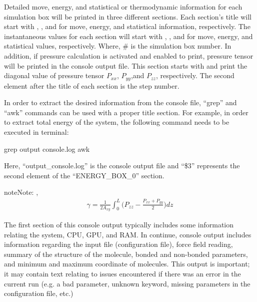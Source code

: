 \documentclass[letterpaper,10pt,english]{sphinxmanual}
\begin{document}
Detailed move, energy, and statistical or thermodynamic information for each simulation box will be printed in three different sections. Each section’s title will start with , , and  for move, energy, and statistical information, respectively. The instantaneous values for each section will start with , , and  for move, energy, and statistical values, respectively. Where, \# is the simulation box number. In addition, if pressure calculation is activated and enabled to print, pressure tensor will be printed in the console output file. This section starts with  and print the diagonal value of pressure tensor \(P_{xx}\), \(P_{yy}\),and \(P_{zz}\), respectively. The second element after the title of each section is the step number.

In order to extract the desired information from the console file, “grep” and “awk” commands can be used with a proper title section. For example, in order to extract total energy of the system, the following command needs to be executed in terminal:

%
\begin{sphinxVerbatim}[commandchars=\\\{\}]
\PYGZdl{} grep  output console.log  awk 
\end{sphinxVerbatim}

Here, “output\_console.log” is the console output file and “\$3” represents the second element of the “ENERGY\_BOX\_0” section.

\begin{sphinxadmonition}{note}{Note:}
,
\begin{equation*}
\begin{split}\gamma = \frac{1}{2A_{xy}} \int_{0}^{L} \bigg(P_{zz} - \frac{P_{xx} + P_{yy}}{2} \bigg) dz\end{split}
\end{equation*}\end{sphinxadmonition}

The first section of this console output typically includes some information relating the system, CPU, GPU, and RAM. In continue, console output includes information regarding the input file (configuration file), force field reading, summary of the structure of the molecule, bonded and non-bonded parameters, and minimum and maximum coordinate of molecules. This output is important; it may contain text relating to issues encountered if there was an error in the current run (e.g. a bad parameter, unknown keyword, missing parameters in the configuration file, etc.)
\end{document}
